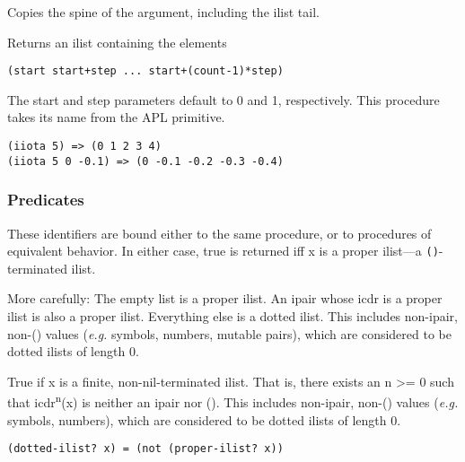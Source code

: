 \begin{entry}{%
  }

  Copies the
  spine of the argument, including the ilist tail.
\end{entry}

\begin{entry}{%
  }

Returns an ilist containing the elements

\begin{verbatim}
(start start+step ... start+(count-1)*step)
\end{verbatim}

  The start and step parameters default to 0 and 1, respectively. This
  procedure takes its name from the APL primitive.

\begin{verbatim}
(iiota 5) => (0 1 2 3 4)
(iiota 5 0 -0.1) => (0 -0.1 -0.2 -0.3 -0.4)
\end{verbatim}
\end{entry}

\subsubsection{{Predicates}}\label{predicates}

\begin{entry}{%
  }

These identifiers are
  bound either to the same procedure, or to procedures of equivalent
  behavior. In either case, true is returned iff x is a proper
  ilist---a \texttt{()}-terminated ilist. 

  More carefully: The empty list is a proper ilist. An ipair whose
  icdr is a proper ilist is also a proper ilist. Everything else is a
  dotted ilist. This includes non-ipair, non-() values (\emph{e.g.}
  symbols, numbers, mutable pairs), which are considered to be dotted
  ilists of length 0.
\end{entry}

\begin{entry}{%
  }

  True if x is
  a finite, non-nil-terminated ilist. That is, there exists an n
  \textgreater{}= 0 such that icdr\textsuperscript{n}(x) is neither an
  ipair nor (). This includes non-ipair, non-() values (\emph{e.g.}
  symbols, numbers), which are considered to be dotted ilists of
  length 0.

\begin{verbatim}
(dotted-ilist? x) = (not (proper-ilist? x))
\end{verbatim}
\end{entry}

